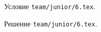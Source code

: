 \problem
Условие \texttt{team/junior/6.tex}.

\solution Решение \texttt{team/junior/6.tex}.
\endproblem
